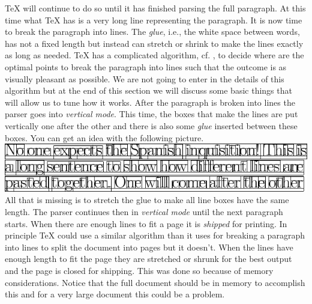 \documentclass[a4paper]{article}
\begin{document}
\noindent \TeX{} will continue to do so until it has finished parsing the full paragraph. At this time what \TeX{} has is a very long line representing the paragraph. It is now time to break the paragraph into lines. The \emph{glue}, i.e., the white space between words, has not a fixed length but instead can stretch or shrink to make the lines exactly as long as needed. \TeX{} has a complicated algorithm, cf. \cite[Chapter~14]{Knuth1990}, to decide where are the optimal points to break the paragraph into lines such that the outcome is as visually pleasant as possible. We are not going to enter in the details of this algorithm but at the end of this section we will discuss some basic things that will allow us to tune how it works.
After the paragraph is broken into lines the parser goes into \emph{vertical mode}. This time, the boxes that make the lines are put vertically one after the other and there is also some \emph{glue} inserted between these boxes. You can get an idea with the following picture.\\ 

\noindent\hfil\includegraphics{glympse_figures/paragraph_boxed.pdf}\hfil\\

\noindent All that is missing is to stretch the glue to make all line boxes have the same length. The parser continues then in \emph{vertical mode} until the next paragraph starts. When there are enough lines to fit a page it is \emph{shipped} for printing. In principle \TeX{} could  use a similar algorithm than it uses for breaking a paragraph into lines to split the document into pages but it doesn't. When the lines have enough length to fit the page they are stretched or shrunk for the best output and the page is closed for shipping. This was done so because of memory considerations. Notice that the full document should be in memory to accomplish this and for a very large document this could be a problem.
\end{document}
